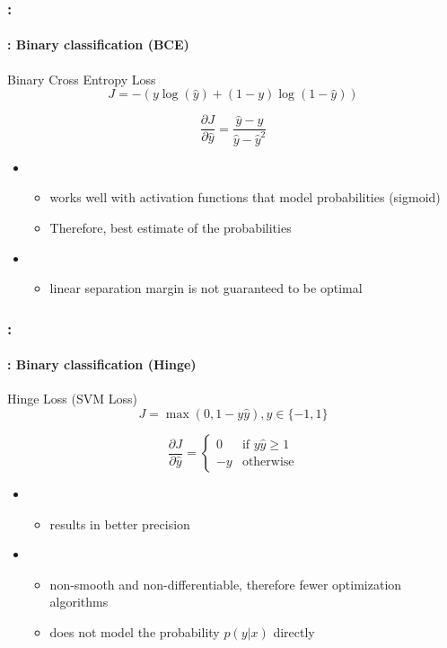 \documentclass[xcolor=table]{beamer}
\begin{document}
\begin{frame}
	\frametitle{\insertshortsubtitle: \insertsection}
	\framesubtitle{\insertsubsection: Binary classification (BCE)}
	
	\begin{block}{Binary Cross Entropy Loss}
		\[J = - (y \log(\hat{y}) + (1 - y) \log(1 - \hat{y}))\]
		
		\[
		\frac{\partial J}{\partial \hat{y}} = \frac{\hat{y} - y}{\hat{y} - \hat{y}^2}
		\]
	\end{block}

	\begin{itemize}
		\item {}
		\begin{itemize}
			\item works well with activation functions that model probabilities (sigmoid)
			\item Therefore, best estimate of the probabilities
		\end{itemize}
		\item {}
		\begin{itemize}
			\item linear separation margin is not guaranteed to be optimal
		\end{itemize}
	\end{itemize}

\end{frame}

\begin{frame}
	\frametitle{\insertshortsubtitle: \insertsection}
	\framesubtitle{\insertsubsection: Binary classification (Hinge)}
	
	\begin{block}{Hinge Loss (SVM Loss)}
		\[J = \max(0, 1 - y \hat{y}), y \in \{-1, 1\}\]
		
		\[
		\frac{\partial J}{\partial \hat{y}} = 
		\begin{cases}
			0 & \text{if } y \hat{y} \ge 1 \\
			-y & \text{otherwise}
		\end{cases}
		\]
	\end{block}

	\begin{itemize}
		\item {}
		\begin{itemize}
			\item results in better precision
		\end{itemize}
		\item {}
		\begin{itemize}
			\item non-smooth and non-differentiable, therefore fewer optimization algorithms
			\item does not model the probability $p(y|x)$ directly
		\end{itemize}
	\end{itemize}

\end{frame}
\end{document}
